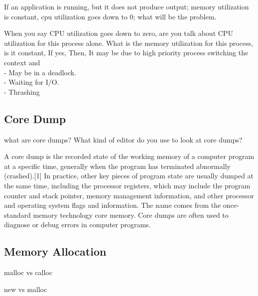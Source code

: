 If an application is running, but it does not produce output; memory utilization is constant, cpu utilization goes down to 0; what will be the problem.

When you say CPU utilization goes down to zero, are you talk about CPU utilization for this process alone. What is the memory utilization for this process, is it constant, If yes, 
Then, It may be due to high priority process switching the context and \\
- May be in a deadlock.\\
- Waiting for I/O. \\
- Thrashing

\subsection{Core Dump}
what are core dumps? What kind of editor do you use to look at core dumps?

A core dump is the recorded state of the working memory of a computer program at a specific time, generally when the program has terminated abnormally (crashed).[1] In practice, 
other key pieces of program state are usually dumped at the same time, including the processor registers, which may include the program counter and stack pointer, memory 
management information, and other processor and operating system flags and information. The name comes from the once-standard memory technology core memory. Core dumps are often 
used to diagnose or debug errors in computer programs.

\subsection{Memory Allocation}
malloc vs calloc

new vs malloc

